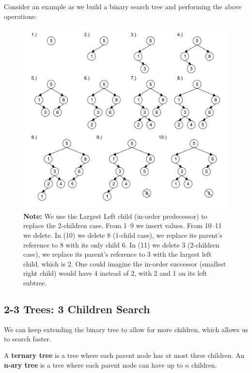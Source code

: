 \newpage 

\noindent
Consider an example as we build a binary search tree and performing the above operations:
\begin{figure}[h]
    \centering
    \includegraphics[width=\textwidth]{./Sections/graphs/search/bst_ex.png}
    \caption{%
        \textbf{Note:} We use the Largest Left child (in-order predecessor) to replace the 2-children case. From 
        1--9 we insert values. From 10--11 we delete. In (10) we delete 8 (1-child case), we replace its 
        parent's reference to 8 with its only child 6. In (11) we delete 3 (2-children case), we replace its parent's reference to 3 with the largest left child, which is 2.
        One could imagine the in-order successor (smallest right child) would have 4 instead of 2, with 2 and 1 on its left subtree.}
    \label{fig:bst_operations}
\end{figure}

\newpage 
\subsection{2-3 Trees: 3 Children Search}

\noindent
We can keep extending the binary tree to allow for more children, which allows us to search faster.

\begin{Def}

    A \textbf{ternary tree} is a tree where each parent node has at most three children. An \textbf{n-ary tree} is a tree where each parent node can have up to $n$ children.
\end{Def}


